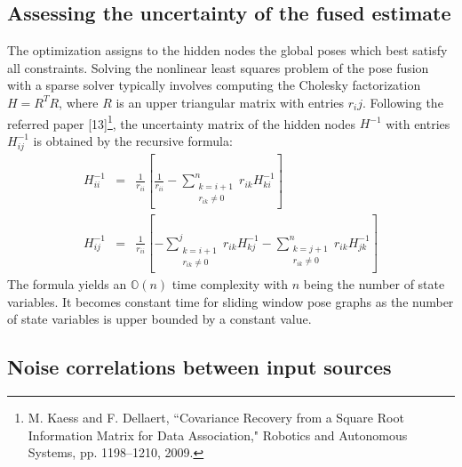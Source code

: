 \documentclass[letterpaper,10pt]{article}
\begin{document}
\subsection{Assessing the uncertainty of the fused estimate}

The optimization assigns to the hidden nodes the global poses which best satisfy all constraints. Solving the nonlinear least squares problem of the pose fusion with a sparse solver typically involves computing the Cholesky factorization $H=R^TR$, where $R$ is an upper triangular matrix with entries $r_ij$. Following the referred paper [13]\footnote{M. Kaess and F. Dellaert, ``Covariance Recovery from a Square Root Information Matrix for Data Association," Robotics and Autonomous Systems, pp. 1198–1210, 2009.}, the uncertainty matrix of the hidden nodes $H^{-1}$ with entries $H_{ij}^{-1}$ is obtained by the recursive formula:
\begin{equation}
\begin{array}{rcl}
H_{ii}^{-1} & = & \frac{1}{r_{ii}}\left[\frac{1}{r_{ii}}-\sum_{\begin{array}{c}
	k=i+1 \\
	r_{ik} \neq 0 \\
	\end{array}}^{n}{r_{ik}H_{ki}^{-1}}\right] \\
H_{ij}^{-1} & = & \frac{1}{r_{ii}}\left[-\sum_{\begin{array}{c}
	k=i+1 \\
	r_{ik} \neq 0 \\
	\end{array}}^{j}{r_{ik}H_{kj}^{-1}}-\sum_{\begin{array}{c}
	k=j+1 \\
	r_{ik} \neq 0 \\
	\end{array}}^{n}{r_{ik}H_{jk}^{-1}}\right]
\end{array}
\end{equation}
The formula yields an $\mathbb{O}(n)$ time complexity with $n$ being the number of state variables. It becomes constant time for sliding window pose graphs as the number of state variables is upper bounded by a constant value.

\subsection{Noise correlations between input sources}
\end{document}
